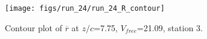 \begin{figure}[H]
\centering
\texttt{[image: figs/run\_24/run\_24\_R\_contour]}
\caption{Contour plot of $\overline{r}$ at $z/c$=7.75, $V_{free}$=21.09, station 3.}
\label{fig:run_24_R_contour}
\end{figure}


